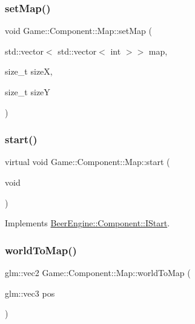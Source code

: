 \subsubsection{\texorpdfstring{set\+Map()}{setMap()}}
{\footnotesize\ttfamily void Game\+::\+Component\+::\+Map\+::set\+Map (\begin{DoxyParamCaption}\item[{std\+::vector$<$ std\+::vector$<$ int $>$$>$}]{map,  }\item[{size\+\_\+t}]{sizeX,  }\item[{size\+\_\+t}]{sizeY }\end{DoxyParamCaption})}

\mbox{\label{class_game_1_1_component_1_1_map_a76e2153b5f69646ba7cf77b6cd0f5096}} 
\subsubsection{\texorpdfstring{start()}{start()}}
{\footnotesize\ttfamily virtual void Game\+::\+Component\+::\+Map\+::start (\begin{DoxyParamCaption}\item[{void}]{ }\end{DoxyParamCaption})\hspace{0.3cm}{\ttfamily [virtual]}}



Implements \mbox{\hyperlink{class_beer_engine_1_1_component_1_1_i_start_aa3e25e86e20c46cdaefc6f6d7f21e495}{Beer\+Engine\+::\+Component\+::\+I\+Start}}.

\mbox{\label{class_game_1_1_component_1_1_map_a0d11f1fd95d17f380ffdc65e7ef9dec9}} 
\subsubsection{\texorpdfstring{world\+To\+Map()}{worldToMap()}}
{\footnotesize\ttfamily glm\+::vec2 Game\+::\+Component\+::\+Map\+::world\+To\+Map (\begin{DoxyParamCaption}\item[{glm\+::vec3}]{pos }\end{DoxyParamCaption})}




